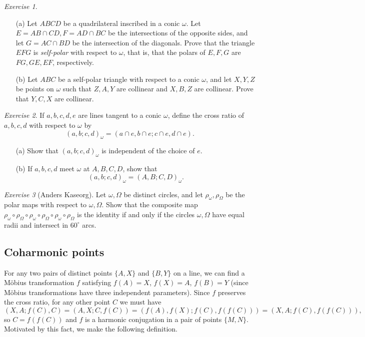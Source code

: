 \documentclass[letterpaper,11pt]{article}
\theoremstyle{definition}
\theoremstyle{remark}
\newtheorem{exer}{Exercise}
\begin{document}
\begin{exer}\label{selfpolar}
\begin{itemize}
\item[(a)] Let $ABCD$ be a quadrilateral inscribed in a conic $\omega$. Let $E = AB\cap CD, F = AD\cap BC$ be the intersections of the opposite sides, and let $G = AC\cap BD$ be the intersection of the diagonals. Prove that the triangle $EFG$ is \emph{self-polar} with respect to $\omega$, that is, that the polars of $E,F,G$ are $FG,GE,EF$, respectively.

\item[(b)] Let $ABC$ be a self-polar triangle with respect to a conic $\omega$, and let $X,Y,Z$ be points on $\omega$ such that $Z,A,Y$ are collinear and $X,B,Z$ are collinear. Prove that $Y,C,X$ are collinear.
\end{itemize}
\end{exer}

\begin{exer} If $a,b,c,d,e$ are lines tangent to a conic $\omega$, define the cross ratio of $a,b,c,d$ with respect to $\omega$ by
\[
(a,b;c,d)_\omega = (a\cap e,b\cap e;c\cap e,d\cap e).
\]
\begin{itemize}
\item[(a)] Show that $(a,b;c,d)_\omega$ is independent of the choice of $e$.

\item[(b)] If $a,b,c,d$ meet $\omega$ at $A,B,C,D$, show that
\[
(a,b;c,d)_\omega = (A,B;C,D)_\omega.
\]
\end{itemize}
\end{exer}

\begin{exer}[Anders Kaseorg] Let $\omega, \Omega$ be distinct circles, and let $\rho_\omega, \rho_\Omega$ be the polar maps with respect to $\omega, \Omega$. Show that the composite map $\rho_\omega\circ\rho_\Omega\circ\rho_\omega\circ\rho_\Omega\circ\rho_\omega\circ\rho_\Omega$ is the identity if and only if the circles $\omega,\Omega$ have equal radii and intersect in $60^\circ$ arcs.
\end{exer}

\subsection{Coharmonic points}

For any two pairs of distinct points $\{A,X\}$ and $\{B,Y\}$ on a line, we can find a M\"obius transformation $f$ satisfying $f(A) = X$, $f(X) = A$, $f(B) = Y$ (since M\"obius transformations have three independent parameters). Since $f$ preserves the cross ratio, for any other point $C$ we must have
\[
(X,A;f(C),C) = (A,X;C,f(C)) = (f(A),f(X);f(C),f(f(C))) = (X,A;f(C),f(f(C))),
\]
so $C = f(f(C))$ and $f$ is a harmonic conjugation in a pair of points $\{M,N\}$. Motivated by this fact, we make the following definition.
\end{document}
